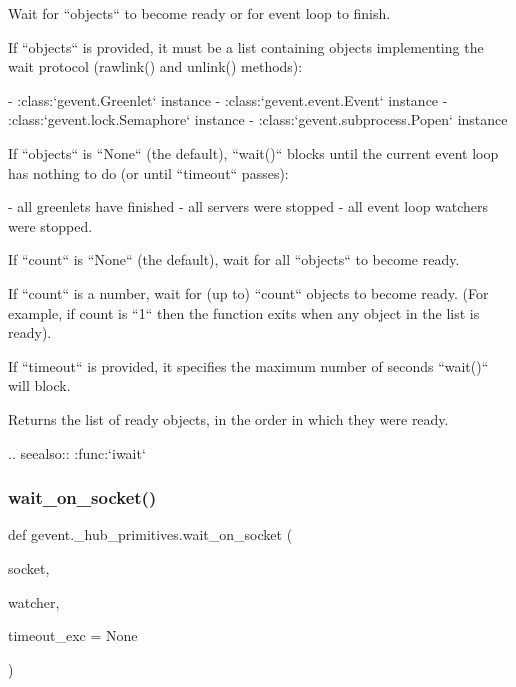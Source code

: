 \begin{DoxyVerb}Wait for ``objects`` to become ready or for event loop to finish.

If ``objects`` is provided, it must be a list containing objects
implementing the wait protocol (rawlink() and unlink() methods):

- :class:`gevent.Greenlet` instance
- :class:`gevent.event.Event` instance
- :class:`gevent.lock.Semaphore` instance
- :class:`gevent.subprocess.Popen` instance

If ``objects`` is ``None`` (the default), ``wait()`` blocks until
the current event loop has nothing to do (or until ``timeout`` passes):

- all greenlets have finished
- all servers were stopped
- all event loop watchers were stopped.

If ``count`` is ``None`` (the default), wait for all ``objects``
to become ready.

If ``count`` is a number, wait for (up to) ``count`` objects to become
ready. (For example, if count is ``1`` then the function exits
when any object in the list is ready).

If ``timeout`` is provided, it specifies the maximum number of
seconds ``wait()`` will block.

Returns the list of ready objects, in the order in which they were
ready.

.. seealso:: :func:`iwait`
\end{DoxyVerb}
 \mbox{\label{namespacegevent_1_1__hub__primitives_a25ceb34f03f1cfac42467e304aed6fd2}} 
\subsubsection{\texorpdfstring{wait\+\_\+on\+\_\+socket()}{wait\_on\_socket()}}
{\footnotesize\ttfamily def gevent.\+\_\+hub\+\_\+primitives.\+wait\+\_\+on\+\_\+socket (\begin{DoxyParamCaption}\item[{}]{socket,  }\item[{}]{watcher,  }\item[{}]{timeout\+\_\+exc = {\ttfamily None} }\end{DoxyParamCaption})}

